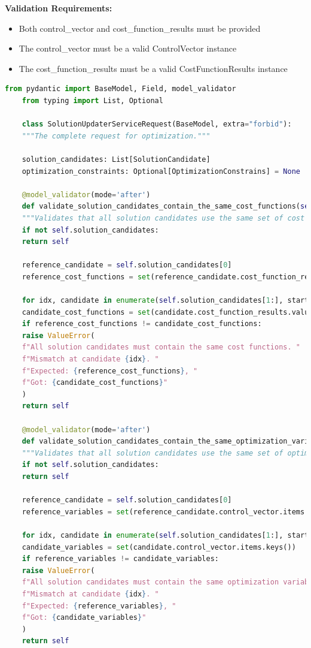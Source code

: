 \textbf{Validation Requirements:}
\begin{itemize}
	\item Both control\_vector and cost\_function\_results must be provided
	\item The control\_vector must be a valid ControlVector instance
	\item The cost\_function\_results must be a valid CostFunctionResults instance
\end{itemize}

\begin{lstlisting}[language=Python, caption={SolutionUpdaterServiceRequest model with complex validation logic}]
	from pydantic import BaseModel, Field, model_validator
	from typing import List, Optional
	
	class SolutionUpdaterServiceRequest(BaseModel, extra="forbid"):
	"""The complete request for optimization."""
	
	solution_candidates: List[SolutionCandidate]
	optimization_constraints: Optional[OptimizationConstrains] = None
	
	@model_validator(mode='after')
	def validate_solution_candidates_contain_the_same_cost_functions(self) -> 'SolutionUpdaterServiceRequest':
	"""Validates that all solution candidates use the same set of cost functions."""
	if not self.solution_candidates:
	return self
	
	reference_candidate = self.solution_candidates[0]
	reference_cost_functions = set(reference_candidate.cost_function_results.values.keys())
	
	for idx, candidate in enumerate(self.solution_candidates[1:], start=1):
	candidate_cost_functions = set(candidate.cost_function_results.values.keys())
	if reference_cost_functions != candidate_cost_functions:
	raise ValueError(
	f"All solution candidates must contain the same cost functions. "
	f"Mismatch at candidate {idx}. "
	f"Expected: {reference_cost_functions}, "
	f"Got: {candidate_cost_functions}"
	)
	return self
	
	@model_validator(mode='after')
	def validate_solution_candidates_contain_the_same_optimization_variables(self) -> 'SolutionUpdaterServiceRequest':
	"""Validates that all solution candidates use the same set of optimization variables."""
	if not self.solution_candidates:
	return self
	
	reference_candidate = self.solution_candidates[0]
	reference_variables = set(reference_candidate.control_vector.items.keys())
	
	for idx, candidate in enumerate(self.solution_candidates[1:], start=1):
	candidate_variables = set(candidate.control_vector.items.keys())
	if reference_variables != candidate_variables:
	raise ValueError(
	f"All solution candidates must contain the same optimization variables. "
	f"Mismatch at candidate {idx}. "
	f"Expected: {reference_variables}, "
	f"Got: {candidate_variables}"
	)
	return self
	

\end{lstlisting}
